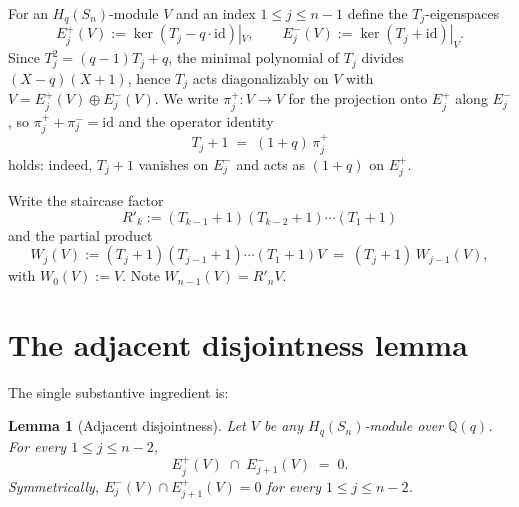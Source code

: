 \documentclass[11pt]{article}
\newtheorem{lemma}[theorem]{Lemma}
\theoremstyle{definition}
\begin{document}
For an $H_q(S_n)$-module $V$ and an index $1 \le j \le n-1$ define
the $T_j$-eigenspaces
\[
   E_j^+(V) := \ker(T_j - q\cdot\mathrm{id})|_V,
   \qquad
   E_j^-(V) := \ker(T_j + \mathrm{id})|_V.
\]
Since $T_j^2 = (q-1) T_j + q$, the minimal polynomial of $T_j$
divides $(X - q)(X + 1)$, hence $T_j$ acts diagonalizably on $V$
with $V = E_j^+(V) \oplus E_j^-(V)$.  We write $\pi_j^+ : V \to V$
for the projection onto $E_j^+$ along $E_j^-$, so
$\pi_j^+ + \pi_j^- = \mathrm{id}$ and the operator identity
\begin{equation}\label{eq:Tj-plus-1}
   T_j + 1 \;=\; (1 + q)\,\pi_j^+
\end{equation}
holds: indeed, $T_j + 1$ vanishes on $E_j^-$ and acts as $(1 + q)$
on $E_j^+$.

Write the staircase factor
\[
   R'_k := (T_{k-1} + 1)(T_{k-2} + 1) \cdots (T_1 + 1)
\]
and the partial product
\[
   W_j(V) := (T_j + 1)(T_{j-1} + 1) \cdots (T_1 + 1) V
   \;=\;
   (T_j + 1)\, W_{j-1}(V),
\]
with $W_0(V) := V$.  Note $W_{n-1}(V) = R'_n V$.

\section{The adjacent disjointness lemma}\label{sec:lemma}

The single substantive ingredient is:

\begin{lemma}[Adjacent disjointness]\label{lem:disjoint}
Let $V$ be any $H_q(S_n)$-module over $\mathbb{Q}(q)$.  For every
$1 \le j \le n-2$,
\[
   E_j^+(V) \;\cap\; E_{j+1}^-(V) \;=\; 0.
\]
Symmetrically, $E_j^-(V) \cap E_{j+1}^+(V) = 0$ for every
$1 \le j \le n-2$.
\end{lemma}
\end{document}

